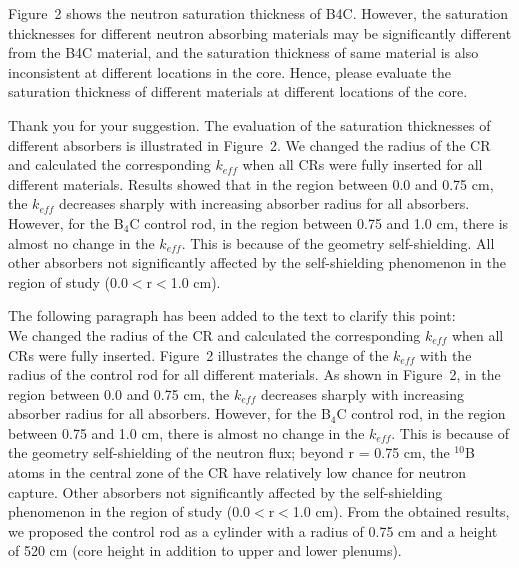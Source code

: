 \documentclass[answers,11pt]{exam}
\begin{document}
\begin{questions}
\begin{solution}
	
	
	\end{solution}

	\question Figure~2 shows the neutron saturation thickness of B4C. However, the saturation thicknesses for different neutron absorbing materials may be significantly different from the B4C material, and the saturation thickness of same material is also inconsistent at different locations in the core. Hence, please evaluate the saturation thickness of different materials at different locations of the core.
\begin{solution}
	
 	 Thank you for your suggestion. The evaluation of the saturation thicknesses of different absorbers is illustrated in Figure~2. 	
	 We changed the radius of the CR and calculated the corresponding $k_{eff}$ when all CRs were fully inserted for all different materials. Results showed that in the region between 0.0 and 0.75 cm, the $k_{eff}$ decreases sharply with increasing absorber radius for all absorbers. However, for the B$_4$C control rod, in the region between 0.75 and 1.0 cm, there is almost no change in the $k_{eff}$. This is because of the geometry self-shielding. All other absorbers not significantly affected by the self-shielding phenomenon in the region of study (0.0$<$r$<$1.0 cm). 
	 
	 The following paragraph has been added to the text to clarify this point:\\
	
     We changed the radius of the CR and calculated the corresponding $k_{eff}$ when all CRs were fully inserted. Figure~2 illustrates the change of the $k_{eff}$ with the radius of the control rod for all different materials. As shown in Figure~2, in the region between 0.0 and 0.75 cm, the $k_{eff}$ decreases sharply with increasing absorber radius for all absorbers. However, for the B$_4$C control rod, in the region between 0.75 and 1.0 cm, there is almost no change in the $k_{eff}$. This is because of the geometry self-shielding of the neutron flux; beyond r = 0.75 cm, the $^{10}$B atoms in the central zone of the CR have relatively low chance for neutron capture. Other absorbers not significantly affected by the self-shielding phenomenon in the region of study (0.0$<$r$<$1.0 cm). From the obtained results, we proposed the control rod as a cylinder with a radius of 0.75 cm and a height of 520 cm (core height in addition to upper and lower plenums).
	 

\end{solution}
\end{questions}
\end{document}
